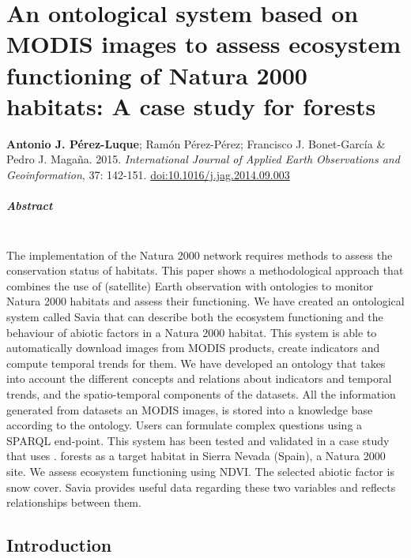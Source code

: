 %
\chapter{\textcolor{ctcolormain}{An ontological system based on MODIS images to assess ecosystem functioning of Natura 2000 habitats: A case study for \Qp forests}}\label{sec:onto}

\mbox{}
\vfill
{\color{ctcolormain}\textbf{Antonio J. Pérez-Luque}}; Ramón Pérez-Pérez; Francisco J. Bonet-García \& Pedro J. Magaña. 2015. \emph{International Journal of Applied Earth Observations and Geoinformation}, 37: 142-151. \href{https://doi.org/10.1016/j.jag.2014.09.003}{doi:10.1016/j.jag.2014.09.003}



\newpage

\paragraph{Abstract} \mbox{} \\
The implementation of the Natura 2000 network requires methods to assess the conservation status of habitats. This paper shows a methodological approach that combines the use of (satellite) Earth observation with ontologies to monitor Natura 2000 habitats and assess their functioning. We have created an ontological system called Savia that can describe both the ecosystem functioning and the behaviour of abiotic factors in a Natura 2000 habitat. This system is able to automatically download images from MODIS products, create indicators and compute temporal trends for them. We have developed an ontology that takes into account the different concepts and relations about indicators and temporal trends, and the spatio-temporal components of the datasets. All the information generated from datasets an MODIS images, is stored into a knowledge base according to the ontology. Users can formulate complex questions using a SPARQL end-point. This system has been tested and validated in a case study that uses \Qpw. forests as a target habitat in Sierra Nevada (Spain), a Natura 2000 site. We assess ecosystem functioning using NDVI. The selected abiotic factor is snow cover. Savia provides useful data regarding these two variables and reflects relationships between them.

\newpage

\section{Introduction}\label{sec:onto:intro}

